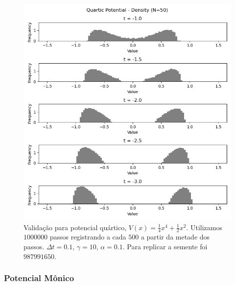 \begin{center}
	\begin{figure}
		\includegraphics[scale=0.8]{images/validationArticleQuartic}
		\caption{Validação para potencial quártico, $V(x) = \frac{1}{4} x^4 + \frac{1}{2} x^2$. Utilizamos $1000000$ passos registrando a cada $500$ a partir da metade dos passos. $\Delta t = 0.1$, $\gamma = 10$, $\alpha = 0.1$. Para replicar a semente foi $987991650$.}
	\end{figure}
\end{center}

\subsubsection{Potencial Mônico}

